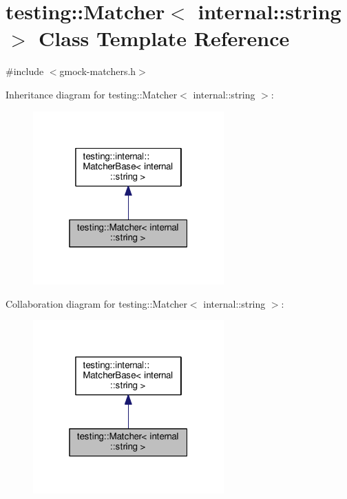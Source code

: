 \hypertarget{classtesting_1_1Matcher_3_01internal_1_1string_01_4}{}\section{testing\+:\+:Matcher$<$ internal\+:\+:string $>$ Class Template Reference}
\label{classtesting_1_1Matcher_3_01internal_1_1string_01_4}


{\ttfamily \#include $<$gmock-\/matchers.\+h$>$}



Inheritance diagram for testing\+:\+:Matcher$<$ internal\+:\+:string $>$\+:
\nopagebreak
\begin{figure}[H]
\begin{center}
\leavevmode
\includegraphics[width=208pt]{classtesting_1_1Matcher_3_01internal_1_1string_01_4__inherit__graph}
\end{center}
\end{figure}


Collaboration diagram for testing\+:\+:Matcher$<$ internal\+:\+:string $>$\+:
\nopagebreak
\begin{figure}[H]
\begin{center}
\leavevmode
\includegraphics[width=208pt]{classtesting_1_1Matcher_3_01internal_1_1string_01_4__coll__graph}
\end{center}
\end{figure}
